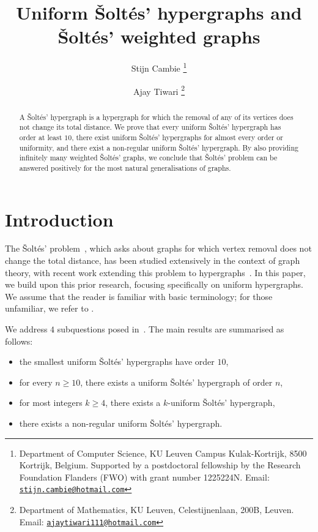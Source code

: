 \documentclass[a4paper,11pt]{article}
\title{Uniform \v Solt\'es' hypergraphs and \v Solt\'es' weighted graphs}
\author{Stijn Cambie
 \thanks{Department of Computer Science, KU Leuven Campus Kulak-Kortrijk, 8500 Kortrijk, Belgium. Supported by a postdoctoral fellowship by the Research Foundation Flanders (FWO) with grant number 1225224N. Email: \protect\href{mailto:stijn.cambie@hotmail.com}{\protect\nolinkurl{stijn.cambie@hotmail.com}}} \and Ajay Tiwari \thanks{Department of Mathematics, KU Leuven, Celestijnenlaan, 200B, Leuven.  Email: \protect\href{mailto:ajaytiwari111@hotmail.com}{\protect\nolinkurl{ajaytiwari111@hotmail.com}} }}
\begin{document}
\parindent=0cm
\maketitle

\begin{abstract}
    A \v Solt\'es' hypergraph is a hypergraph for which the removal of any of its vertices does not change its total distance.
    We prove that every uniform \v Solt\'es' hypergraph has order at least $10$, there exist uniform \v Solt\'es' hypergraphs for almost every order or uniformity, and there exist a non-regular uniform \v Solt\'es' hypergraph.
    By also providing infinitely many weighted \v Solt\'es' graphs, we conclude that  \v Solt\'es' problem can be answered positively for the most natural generalisations of graphs.
\end{abstract}


\section{Introduction}
The \v Solt\'es' problem~\cite{Soltes91}, which asks about graphs for which vertex removal does not change the total distance, has been studied extensively in the context of graph theory, with recent work extending this problem to hypergraphs~\cite{Cambie24Hyper}. In this paper, we build upon this prior research, focusing specifically on uniform hypergraphs. We assume that the reader is familiar with basic terminology; for those unfamiliar, we refer to \cite[Subsec.~1.1]{Cambie24Hyper}.
    
    We address $4$ subquestions posed in~\cite[Ques.~13]{Cambie24Hyper}.
    The main results are summarised as follows:
    \begin{itemize}
        \item the smallest uniform \v Solt\'es' hypergraphs have order $10$,
        \item for every $n \ge 10$, there exists a uniform \v Solt\'es' hypergraph of order $n$,
        \item for most integers $k \ge 4$, there exists a $k$-uniform \v Solt\'es' hypergraph,
        \item there exists a non-regular uniform \v Solt\'es' hypergraph.
    \end{itemize}
\end{document}
